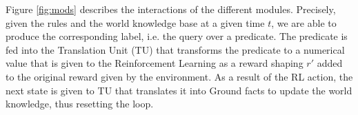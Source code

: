 Figure \ref{fig:mods} describes the interactions of the different modules. Precisely, 
given the rules and the world knowledge base at a given time $t$, we are able 
to produce the corresponding label, i.e. the query over a predicate. The predicate is fed 
into the Translation Unit (TU) that transforms the predicate to a numerical value that is given to the Reinforcement Learning 
as a reward shaping $r'$ added to the original reward given by the environment. As a result of the RL action, the next state is given 
to TU that translates it into Ground facts to update the world knowledge, thus resetting the loop.
